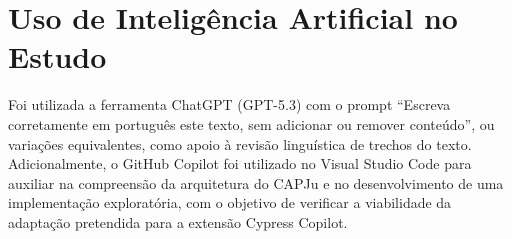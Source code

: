 \chapter{Uso de Inteligência Artificial no Estudo}
\label{ch:inteligencia}

Foi utilizada a ferramenta ChatGPT (GPT-5.3) com o prompt “Escreva corretamente em português este texto, sem adicionar ou remover conteúdo”, ou variações equivalentes, como apoio à revisão linguística de trechos do texto. Adicionalmente, o GitHub Copilot foi utilizado no Visual Studio Code para auxiliar na compreensão da arquitetura do CAPJu e no desenvolvimento de uma implementação exploratória, com o objetivo de verificar a viabilidade da adaptação pretendida para a extensão Cypress Copilot.